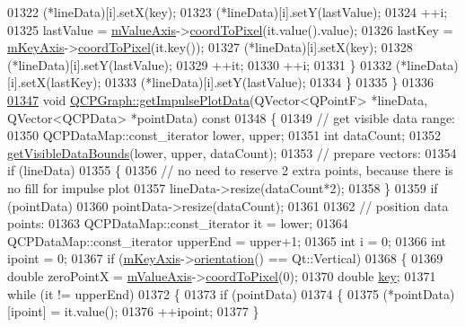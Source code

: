 \begin{DoxyCode}
01322       (*lineData)[i].setX(key);
01323       (*lineData)[i].setY(lastValue);
01324       ++i;
01325       lastValue = \hyperlink{a00024_acfc46d619ab9598be33b64146da45822}{mValueAxis}->\hyperlink{a00025_a985ae693b842fb0422b4390fe36d299a}{coordToPixel}(it.value().value);
01326       lastKey = \hyperlink{a00024_a692421b963472fa6e16156a74ba96832}{mKeyAxis}->\hyperlink{a00025_a985ae693b842fb0422b4390fe36d299a}{coordToPixel}(it.key());
01327       (*lineData)[i].setX(key);
01328       (*lineData)[i].setY(lastValue);
01329       ++it;
01330       ++i;
01331     \}
01332     (*lineData)[i].setX(lastKey);
01333     (*lineData)[i].setY(lastValue);
01334   \}
01335 \}
01336 
\hypertarget{a00115_source_l01347}{}\hyperlink{a00031_a0ff6e856387cc079b28592ead2a81f6c}{01347} \textcolor{keywordtype}{void} \hyperlink{a00031_a0ff6e856387cc079b28592ead2a81f6c}{QCPGraph::getImpulsePlotData}(QVector<QPointF> *lineData, QVector<QCPData> 
      *pointData)\textcolor{keyword}{ const}
01348 \textcolor{keyword}{}\{
01349   \textcolor{comment}{// get visible data range:}
01350   QCPDataMap::const\_iterator lower, upper;
01351   \textcolor{keywordtype}{int} dataCount;
01352   \hyperlink{a00031_a8963c90087cf53b889b29dd59aa41aad}{getVisibleDataBounds}(lower, upper, dataCount);
01353   \textcolor{comment}{// prepare vectors:}
01354   \textcolor{keywordflow}{if} (lineData)
01355   \{
01356     \textcolor{comment}{// no need to reserve 2 extra points, because there is no fill for impulse plot}
01357     lineData->resize(dataCount*2);
01358   \}
01359   \textcolor{keywordflow}{if} (pointData)
01360     pointData->resize(dataCount);
01361   
01362   \textcolor{comment}{// position data points:}
01363   QCPDataMap::const\_iterator it = lower;
01364   QCPDataMap::const\_iterator upperEnd = upper+1;
01365   \textcolor{keywordtype}{int} i = 0;
01366   \textcolor{keywordtype}{int} ipoint = 0;
01367   \textcolor{keywordflow}{if} (\hyperlink{a00024_a692421b963472fa6e16156a74ba96832}{mKeyAxis}->\hyperlink{a00025_a57483f2f60145ddc9e63f3af53959265}{orientation}() == Qt::Vertical)
01368   \{
01369     \textcolor{keywordtype}{double} zeroPointX = \hyperlink{a00024_acfc46d619ab9598be33b64146da45822}{mValueAxis}->\hyperlink{a00025_a985ae693b842fb0422b4390fe36d299a}{coordToPixel}(0);
01370     \textcolor{keywordtype}{double} \hyperlink{a00116_a94bb892c30911cd62cba0707a5395be4}{key};
01371     \textcolor{keywordflow}{while} (it != upperEnd)
01372     \{
01373       \textcolor{keywordflow}{if} (pointData)
01374       \{
01375         (*pointData)[ipoint] = it.value();
01376         ++ipoint;
01377       \}

\end{DoxyCode}
